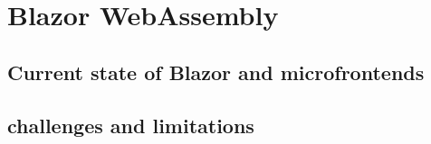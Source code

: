 \section{Blazor WebAssembly}
\subsection{Current state of Blazor and microfrontends}
\subsection{challenges and limitations}